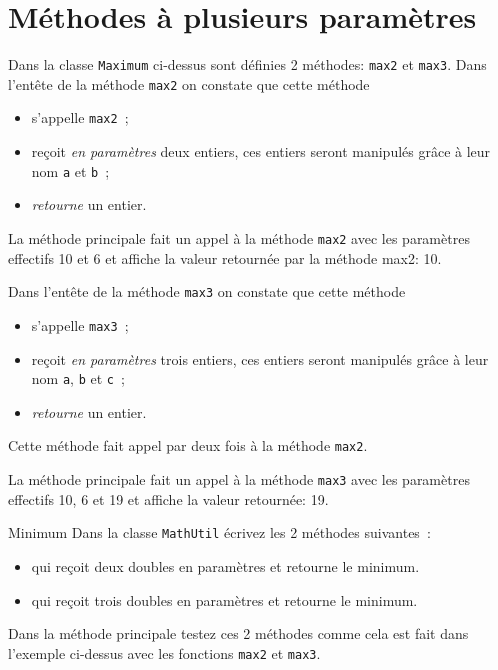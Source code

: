 \documentclass[a4paper,11pt]{style-esi/td}
\begin{document}
\section{Méthodes à plusieurs paramètres}

	
	Dans la classe \texttt{Maximum} ci-dessus sont définies 2 méthodes: \texttt{max2} et \texttt{max3}.
	Dans l'entête de la méthode \texttt{max2} on constate que cette méthode 
	\begin{itemize}
		\item s'appelle \texttt{max2}~;
		\item reçoit \emph{en paramètres} deux entiers, ces entiers seront manipulés grâce à leur nom \texttt{a} et \texttt{b}~;
		\item \emph{retourne} un entier.
	\end{itemize}
		

	La méthode principale fait un appel à la méthode \texttt{max2} avec les paramètres effectifs 10 et 6 
	et affiche la valeur retournée par la méthode max2: 10.
	
	 Dans l'entête de la méthode \texttt{max3} on constate que cette méthode 
	\begin{itemize}
		\item s'appelle \texttt{max3}~;
		\item reçoit \emph{en paramètres} trois entiers, ces entiers seront manipulés grâce à leur nom \texttt{a}, \texttt{b} et \texttt{c}~;
		\item \emph{retourne} un entier.
	\end{itemize}

	Cette méthode fait appel par deux fois à la méthode \texttt{max2}.
	
	La méthode principale fait un appel à la méthode \texttt{max3} avec les paramètres effectifs 10, 6 et 19 
	et affiche la valeur retournée: 19.

 
 	\begin{Exercice}{Minimum}
		Dans la classe \texttt{MathUtil} écrivez les 2 méthodes suivantes~:		
		\begin{itemize}
			\item {} qui reçoit deux doubles en paramètres et retourne le minimum.
			\item {} qui reçoit trois doubles en paramètres et retourne le minimum.
		\end{itemize}
		
		Dans la méthode principale testez ces 2 méthodes comme cela est fait dans l'exemple ci-dessus avec les fonctions 
		\texttt{max2} et \texttt{max3}.
	\end{Exercice} 
		
\end{document}
